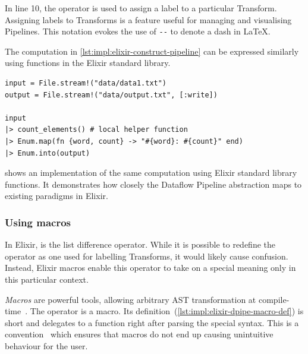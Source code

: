 In line 10, the \exs{--} operator is used to assign a label to a particular Transform.
Assigning labels to Transforms is a feature useful for managing and visualising Pipelines.
This notation evokes the use of \verb|--| to denote a dash in \LaTeX.

\begin{listing}[h]
	\caption[An implementation of the computation in \cref{lst:impl:elixir-construct-pipeline} using standard sequential functions.]{The computation in \cref{lst:impl:elixir-construct-pipeline} can be expressed similarly using functions in the Elixir standard library.}
	\label{lst:impl:elixir-normal-comparison}
	\begin{verbatim}
input = File.stream!("data/data1.txt")
output = File.stream!("data/output.txt", [:write])

input
|> count_elements() # local helper function
|> Enum.map(fn {word, count} -> "#{word}: #{count}" end)
|> Enum.into(output)
	\end{verbatim}
\end{listing}

 shows an implementation of the same computation using Elixir standard library functions.
It demonstrates how closely the Dataflow Pipeline abstraction maps to existing paradigms in Elixir.

\subsubsection{Using macros}

In Elixir, \exs{--} is the list difference operator.
While it is possible to redefine the \exs{--} operator as one used for labelling Transforms, it would likely cause confusion.
Instead, Elixir macros enable this operator to take on a special meaning only in this particular context.

\emph{Macros} are powerful tools, allowing arbitrary AST transformation at compile-time~\cite[p.~13]{Elixir-Metaprogramming}.
The \exs{~>} operator is a macro.
Its definition~(\cref{lst:impl:elixir-dpipe-macro-def}) is short and delegates to a function right after parsing the special syntax.
This is a convention~\cite[p.~7]{Elixir-Metaprogramming} which ensures that macros do not end up causing unintuitive behaviour for the user.

